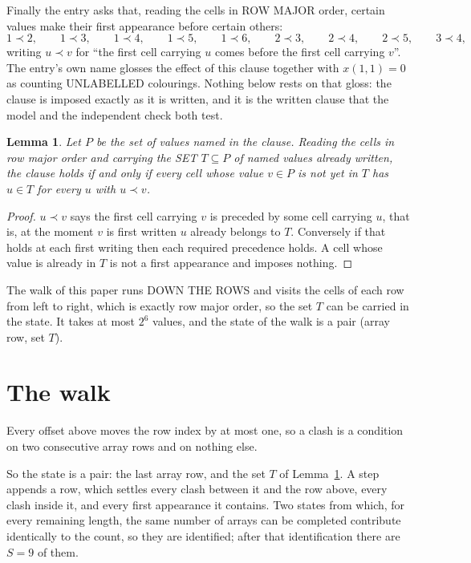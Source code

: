 \documentclass[11pt,a4paper]{article}
\theoremstyle{plain}
\newtheorem{lemma}[theorem]{Lemma}
\theoremstyle{definition}
\begin{document}
Finally the entry asks that, reading the cells in ROW MAJOR order, certain values make their
first appearance before certain others:
\[
1\prec 2,\qquad 1\prec 3,\qquad 1\prec 4,\qquad 1\prec 5,\qquad 1\prec 6,\qquad 2\prec 3,\qquad 2\prec 4,\qquad 2\prec 5,\qquad 3\prec 4 ,
\]
writing $u\prec v$ for ``the first cell carrying $u$ comes before the first cell carrying
$v$''. The entry's own name glosses the effect of this clause together with $x(1,1)=0$ as
counting UNLABELLED colourings. Nothing below rests on that gloss: the clause is imposed
exactly as it is written, and it is the written clause that the model and the independent
check both test.

\begin{lemma}\label{lem:seen}
Let $P$ be the set of values named in the clause. Reading the cells in row major order and
carrying the SET $T\subseteq P$ of named values already written, the clause holds if and only
if every cell whose value $v\in P$ is not yet in $T$ has $u\in T$ for every $u$ with $u\prec v$.
\end{lemma}

\begin{proof}
$u\prec v$ says the first cell carrying $v$ is preceded by some cell carrying $u$, that is, at
the moment $v$ is first written $u$ already belongs to $T$. Conversely if that holds at each
first writing then each required precedence holds. A cell whose value is already in $T$ is not
a first appearance and imposes nothing.
\end{proof}

The walk of this paper runs DOWN THE ROWS and visits the cells of each row from left to right,
which is exactly row major order, so the set $T$ can be carried in the state. It takes at most
$2^{6}$ values, and the state of the walk is a pair (array row, set $T$).

\section{The walk}

Every offset above moves the row index by at most one, so a clash is a condition on two
consecutive array rows and on nothing else.

So the state is a pair: the last array row, and the set $T$ of Lemma~\ref{lem:seen}. A step
appends a row, which settles every clash between it and the row above, every clash inside it,
and every first appearance it contains. Two states from which, for every remaining length, the
same number of arrays can be completed contribute identically to the count, so they are
identified; after that identification there are $S=9$ of them.
\end{document}
